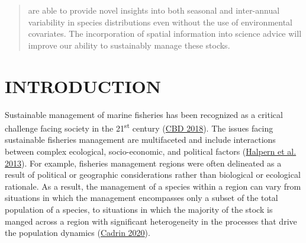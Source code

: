 \documentclass[
]{article}
\begin{document}
\begin{abstract}
are able to provide novel insights into both seasonal and inter-annual variability in species distributions even without the use of environmental covariates. The incorporation of spatial information into science advice will improve our ability to sustainably manage these stocks.
\end{abstract}

\hypertarget{ref-intro}{%
\section{INTRODUCTION}\label{ref-intro}}

Sustainable management of marine fisheries has been recognized as a critical challenge facing society in the 21\textsuperscript{st} century (\protect\hyperlink{ref-cbdAichiBiodiversityTargets2018}{CBD 2018}). The issues facing sustainable fisheries management are multifaceted and include interactions between complex ecological, socio-economic, and political factors (\protect\hyperlink{ref-halpernAchievingTripleBottom2013}{Halpern et al. 2013}). For example, fisheries management regions were often delineated as a result of political or geographic considerations rather than biological or ecological rationale. As a result, the management of a species within a region can vary from situations in which the management encompasses only a subset of the total population of a species, to situations in which the majority of the stock is manged across a region with significant heterogeneity in the processes that drive the population dynamics (\protect\hyperlink{ref-cadrinDefiningSpatialStructure2020a}{Cadrin 2020}).
\end{document}
